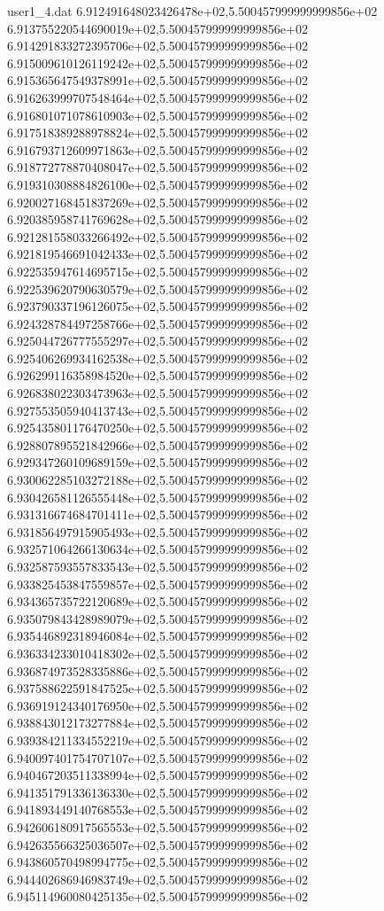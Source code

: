 \begin{filecontents}{user1_4.dat}
6.912491648023426478e+02,5.500457999999999856e+02
6.913755220544690019e+02,5.500457999999999856e+02
6.914291833272395706e+02,5.500457999999999856e+02
6.915009610126119242e+02,5.500457999999999856e+02
6.915365647549378991e+02,5.500457999999999856e+02
6.916263999707548464e+02,5.500457999999999856e+02
6.916801071078610903e+02,5.500457999999999856e+02
6.917518389288978824e+02,5.500457999999999856e+02
6.916793712609971863e+02,5.500457999999999856e+02
6.918772778870408047e+02,5.500457999999999856e+02
6.919310308884826100e+02,5.500457999999999856e+02
6.920027168451837269e+02,5.500457999999999856e+02
6.920385958741769628e+02,5.500457999999999856e+02
6.921281558033266492e+02,5.500457999999999856e+02
6.921819546691042433e+02,5.500457999999999856e+02
6.922535947614695715e+02,5.500457999999999856e+02
6.922539620790630579e+02,5.500457999999999856e+02
6.923790337196126075e+02,5.500457999999999856e+02
6.924328784497258766e+02,5.500457999999999856e+02
6.925044726777555297e+02,5.500457999999999856e+02
6.925406269934162538e+02,5.500457999999999856e+02
6.926299116358984520e+02,5.500457999999999856e+02
6.926838022303473963e+02,5.500457999999999856e+02
6.927553505940413743e+02,5.500457999999999856e+02
6.925435801176470250e+02,5.500457999999999856e+02
6.928807895521842966e+02,5.500457999999999856e+02
6.929347260109689159e+02,5.500457999999999856e+02
6.930062285103272188e+02,5.500457999999999856e+02
6.930426581126555448e+02,5.500457999999999856e+02
6.931316674684701411e+02,5.500457999999999856e+02
6.931856497915905493e+02,5.500457999999999856e+02
6.932571064266130634e+02,5.500457999999999856e+02
6.932587593557833543e+02,5.500457999999999856e+02
6.933825453847559857e+02,5.500457999999999856e+02
6.934365735722120689e+02,5.500457999999999856e+02
6.935079843428989079e+02,5.500457999999999856e+02
6.935446892318946084e+02,5.500457999999999856e+02
6.936334233010418302e+02,5.500457999999999856e+02
6.936874973528335886e+02,5.500457999999999856e+02
6.937588622591847525e+02,5.500457999999999856e+02
6.936919124340176950e+02,5.500457999999999856e+02
6.938843012173277884e+02,5.500457999999999856e+02
6.939384211334552219e+02,5.500457999999999856e+02
6.940097401754707107e+02,5.500457999999999856e+02
6.940467203511338994e+02,5.500457999999999856e+02
6.941351791336136330e+02,5.500457999999999856e+02
6.941893449140768553e+02,5.500457999999999856e+02
6.942606180917565553e+02,5.500457999999999856e+02
6.942635566325036507e+02,5.500457999999999856e+02
6.943860570498994775e+02,5.500457999999999856e+02
6.944402686946983749e+02,5.500457999999999856e+02
6.945114960080425135e+02,5.500457999999999856e+02

\end{filecontents}
